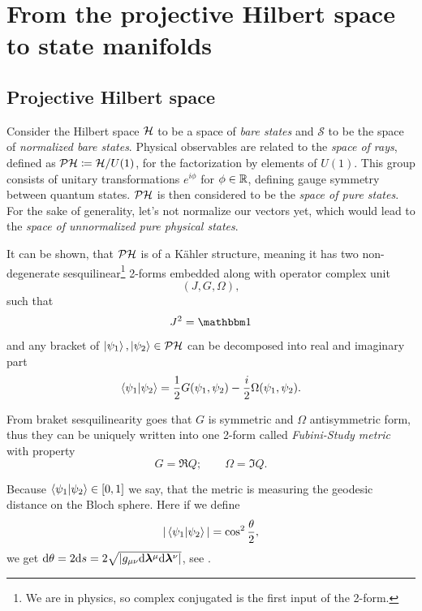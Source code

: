 \chapter{From the projective Hilbert space to state manifolds}

\section{Projective Hilbert space}
Consider the Hilbert space $\mathcal{H}$ to be a space of \emph{bare states} and $\mathcal{S}$ to be the space of \emph{normalized bare states}. Physical observables are related to the \emph{space of rays}, defined as $\mathcal{PH}\coloneqq \mathcal{H}/U(1)$, for the factorization by elements of $U(1)$. This group consists of unitary transformations $e^{i\phi}$ for $\phi\in\mathbb{R}$, defining gauge symmetry between quantum states. $\mathcal{PH}$ is then considered to be the \emph{space of pure states}. For the sake of generality, let's not normalize our vectors yet, which would lead to the \emph{space of unnormalized pure physical states}. 

It can be shown, that $\mathcal{PH}$ is of a K\"ahler structure, meaning it has two non-degenerate sesquilinear\footnote{We are in physics, so complex conjugated is the first input of the 2-form.} 2-forms embedded along with operator complex unit
$$(J, G, \Omega),$$
such that
\begin{equation}
    J^2=\Id
\end{equation}
and any bracket of $\ket{\psi_1},\ket{\psi_2}\in \mathcal{PH}$ can be decomposed into real and imaginary part\citep{ashtekar_geometrical_1997}
\begin{equation}
    \braket{\psi_1|\psi_2}=\frac{1}{2}G(\psi_1,\psi_2)-\frac{i}{2}\Omega(\psi_1,\psi_2).
    \label{eq:quantumProd}
\end{equation}

From braket sesquilinearity goes that $G$ is symmetric and $\Omega$ antisymmetric form, thus they can be uniquely written into one 2-form called \emph{Fubini-Study metric} with property
\begin{equation}
    G=\Re Q ;\qquad \Omega=\Im Q.
\end{equation}

Because $\braket{\psi_1|\psi_2}\in[0,1]$ we say, that the metric is measuring the geodesic distance on the Bloch sphere. Here if we define
\begin{equation}
    |\braket{\psi_1|\psi_2}|=\cos^2 \frac{\theta}{2},
\end{equation}
we get $\mathrm{d} \theta= 2\mathrm{d} s=2\sqrt{|g_{\mu\nu}\mathrm{d} {\bm\lambda}^\mu\mathrm{d} {\bm\lambda}^\nu|}$, see \citet{cheng_quantum_2013}.

